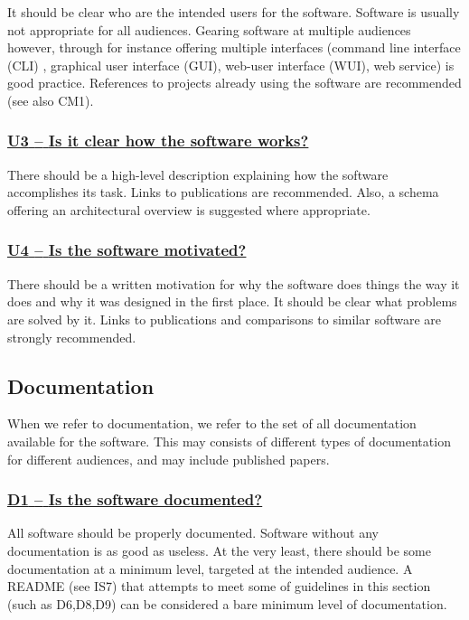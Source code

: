 \documentclass[a4paper,11pt]{article}
\newcommand{\criterion}[1]{\subsubsection*{\underline{#1}}}
\begin{document}
It should be clear who are the intended users for the software. Software is
usually not appropriate for all audiences. Gearing software at multiple
audiences however, through for instance offering multiple interfaces (command
line interface (CLI) , graphical user interface (GUI), web-user interface
(WUI), web service) is good practice. References to projects already using the
software are recommended (see also CM1).

\newcommand{\uThreeID}{U3}
\newcommand{\uThreeText}{Is it clear how the software works?}
\criterion{\uThreeID{ }--{ }\uThreeText}\label{id:u3}

There should be a high-level description explaining how the software
accomplishes its task. Links to publications are recommended. Also, a schema
offering an architectural overview is suggested where appropriate. 

\newcommand{\uFourID}{U4}
\newcommand{\uFourText}{Is the software motivated?}
\criterion{\uFourID{ }--{ }\uFourText}\label{id:u4}

There should be a written motivation for why the software does things the way
it does and why it was designed in the first place. It should be clear what
problems are solved by it. Links to publications and comparisons to similar
software are strongly recommended.

\subsection{Documentation}\label{sec:doc}

When we refer to documentation, we refer to the set of all documentation
available for the software. This may consists of different types of
documentation for different audiences, and may include published papers.

\newcommand{\dOneID}{D1}
\newcommand{\dOneText}{Is the software documented?}
\criterion{\dOneID{ }--{ }\dOneText}\label{id:d1}

All software should be properly documented. Software without any documentation
is as good as useless. At the very least, there should be some documentation at
a minimum level, targeted at the intended audience. A README (see IS7) that
attempts to meet some of guidelines in this section (such as D6,D8,D9) can be
considered a bare minimum level of documentation.

%
%
%
\end{document}

